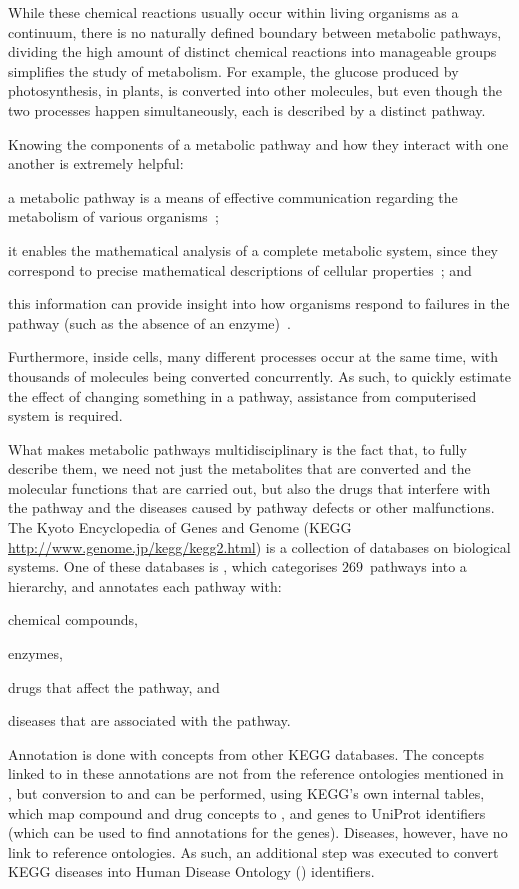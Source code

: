 While these chemical reactions usually occur within living organisms as a continuum, \ie there is no naturally defined boundary between metabolic pathways, dividing the high amount of distinct chemical reactions into manageable groups simplifies the study of metabolism. For example, the glucose produced by photosynthesis, in plants, is converted into other molecules, but even though the two processes happen simultaneously, each is described by a distinct pathway.

Knowing the components of a metabolic pathway and how they interact with one another is extremely helpful:
\begin{paralist}
    \item a metabolic pathway is a means of effective communication regarding the metabolism of various organisms~\citep{Papin2003};
    \item it enables the mathematical analysis of a complete metabolic system, since they correspond to precise mathematical descriptions of cellular properties~\citep{Papin2003}; and
    \item this information can provide insight into how organisms respond to failures in the pathway (such as the absence of an enzyme)~\citep{Baumgartner2011}.
\end{paralist}
Furthermore, inside cells, many different processes occur at the same time, with thousands of molecules being converted concurrently. As such, to quickly estimate the effect of changing something in a pathway, assistance from computerised system is required.

What makes metabolic pathways multidisciplinary is the fact that, to fully describe them, we need not just the metabolites that are converted and the molecular functions that are carried out, but also the drugs that interfere with the pathway and the diseases caused by pathway defects or other malfunctions. The Kyoto Encyclopedia of Genes and Genome (KEGG \mdash \url{http://www.genome.jp/kegg/kegg2.html}) is a collection of databases on biological systems. One of these databases is , which categorises $269$~pathways into a hierarchy, and annotates each pathway with:
\begin{paralist}
    \item chemical compounds,
    \item enzymes,
    \item drugs that affect the pathway, and
    \item diseases that are associated with the pathway.
\end{paralist}
Annotation is done with concepts from other KEGG databases. The concepts linked to in these annotations are not from the reference ontologies mentioned in , but conversion to  and  can be performed, using KEGG's own internal tables, which map compound and drug concepts to , and genes to UniProt identifiers (which can be used to find  annotations for the genes). Diseases, however, have no link to reference ontologies. As such, an additional step was executed to convert KEGG diseases into Human Disease Ontology () identifiers.

